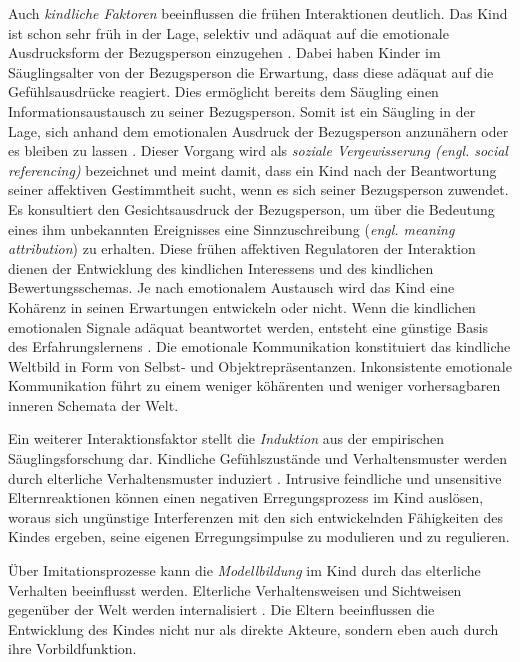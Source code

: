 Auch \textit{kindliche Faktoren} beeinflussen die frühen Interaktionen deutlich. Das Kind ist schon sehr früh in der Lage, selektiv und adäquat auf die emotionale Ausdrucksform der Bezugsperson einzugehen \cite{Harris1994}. Dabei haben Kinder im Säuglingsalter von der Bezugsperson die Erwartung, dass diese adäquat auf die Gefühlsausdrücke reagiert. Dies ermöglicht bereits dem Säugling einen Informationsaustausch zu seiner Bezugsperson. Somit ist ein Säugling in der Lage, sich anhand dem emotionalen Ausdruck der Bezugsperson anzunähern oder es bleiben zu lassen \cite{Resch1999}. Dieser Vorgang wird als \textit{soziale Vergewisserung (\textit{engl. social referencing})} bezeichnet und meint damit, dass ein Kind nach der Beantwortung seiner affektiven Gestimmtheit sucht, wenn es sich seiner Bezugsperson zuwendet. Es konsultiert den Gesichtsausdruck der Bezugsperson, um über die Bedeutung eines ihm unbekannten Ereignisses eine Sinnzuschreibung (\textit{engl. meaning attribution}) zu erhalten. Diese frühen affektiven Regulatoren der Interaktion dienen der Entwicklung des kindlichen Interessens und des kindlichen Bewertungsschemas. Je nach emotionalem Austausch wird das Kind eine Kohärenz in seinen Erwartungen entwickeln oder nicht. Wenn die kindlichen emotionalen Signale adäquat beantwortet werden, entsteht eine günstige Basis des Erfahrungslernens \cite[S.~95]{Resch1999}. Die emotionale Kommunikation konstituiert das kindliche Weltbild in Form von Selbst- und Objektrepräsentanzen. Inkonsistente emotionale Kommunikation führt zu einem weniger köhärenten und weniger vorhersagbaren inneren Schemata der Welt. 

Ein weiterer Interaktionsfaktor stellt die \textit{Induktion} aus der empirischen Säuglingsforschung dar. Kindliche Gefühlszustände und Verhaltensmuster werden durch elterliche Verhaltensmuster induziert \cite{Cummings1994}. Intrusive feindliche und unsensitive Elternreaktionen können einen negativen Erregungsprozess im Kind auslösen, woraus sich ungünstige Interferenzen mit den sich entwickelnden Fähigkeiten des Kindes ergeben, seine eigenen Erregungsimpulse zu modulieren und zu regulieren.  

Über Imitationsprozesse kann die \textit{Modellbildung} im Kind durch das elterliche Verhalten beeinflusst werden. Elterliche Verhaltensweisen und Sichtweisen gegenüber der Welt werden internalisiert \cite{Resch1999}. Die Eltern beeinflussen die Entwicklung des Kindes nicht nur als direkte Akteure, sondern eben auch durch ihre Vorbildfunktion. 

